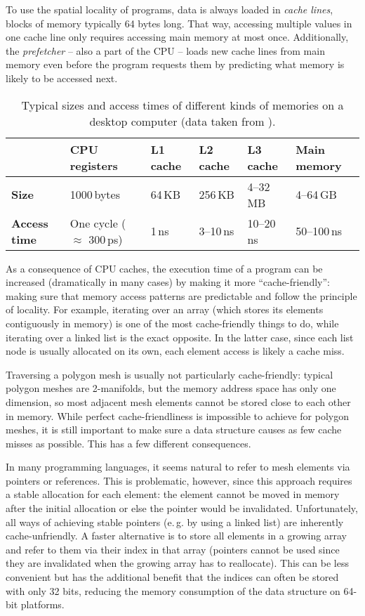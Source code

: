 To use the spatial locality of programs, data is always loaded in \emph{cache lines}, blocks of memory typically 64 bytes long.
That way, accessing multiple values in one cache line only requires accessing main memory at most once.
Additionally, the \emph{prefetcher} -- also a part of the CPU -- loads new cache lines from main memory even before the program requests them by predicting what memory is likely to be accessed next.

\begin{table}[t]
  \centering
  \small
  \sffamily
  \begin{tabular}{llllll}
  & \textbf{CPU registers} & \textbf{L1 cache} & \textbf{L2 cache} & \textbf{L3 cache} & \textbf{Main memory} \\\hline
  \textbf{Size} & 1000\,bytes & 64\,KB & 256\,KB & 4--32\,MB & 4--64\,GB \\\hline
  \textbf{Access time} & One cycle ($\approx$ 300\,ps) & 1\,ns & 3--10\,ns & 10--20\,ns & 50--100\,ns \\\hline
  \end{tabular}
  \caption{Typical sizes and access times of different kinds of memories on a desktop computer (data taken from \cite{hennessy2017computer}).}
  \label{tbl:caches}
  \vspace{5mm}
\end{table}

As a consequence of CPU caches, the execution time of a program can be increased (dramatically in many cases) by making it more \enquote{cache-friendly}: making sure that memory access patterns are predictable and follow the principle of locality.
For example, iterating over an array (which stores its elements contiguously in memory) is one of the most cache-friendly things to do, while iterating over a linked list is the exact opposite.
In the latter case, since each list node is usually allocated on its own, each element access is likely a cache miss.

Traversing a polygon mesh is usually not particularly cache-friendly:
typical polygon meshes are 2-manifolds, but the memory address space has only one dimension, so most adjacent mesh elements cannot be stored close to each other in memory.
While perfect cache-friendliness is impossible to achieve for polygon meshes, it is still important to make sure a data structure causes as few cache misses as possible.
This has a few different consequences.

In many programming languages, it seems natural to refer to mesh elements via pointers or references.
This is problematic, however, since this approach requires a stable allocation for each element: the element cannot be moved in memory after the initial allocation or else the pointer would be invalidated.
Unfortunately, all ways of achieving stable pointers (e.\,g. by using a linked list) are inherently cache-unfriendly.
A faster alternative is to store all elements in a growing array and refer to them via their index in that array (pointers cannot be used since they are invalidated when the growing array has to reallocate).
This can be less convenient but has the additional benefit that the indices can often be stored with only 32 bits, reducing the memory consumption of the data structure on 64-bit platforms.

